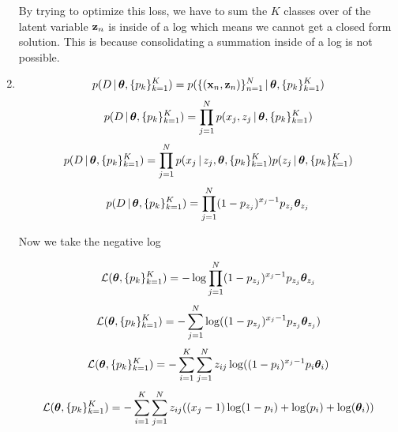 \documentclass[submit]{harvardml}
\begin{document}
\begin{enumerate}
        By trying to optimize this loss, we have to sum the $K$ classes over of the latent variable $\mathbf{z}_{n}$ is inside of a log which means we cannot get a closed form solution. This is because consolidating a summation inside of a log is not possible.
    
    \item
        \begin{equation*}
            p(D \,|\,\boldsymbol{\theta}, \{p_k\}^K_{k=1}) =  p(\{(\mathbf{x}_n, \mathbf{z}_n)\}_{n=1}^N \,|\,\boldsymbol{\theta}, \{p_k\}^K_{k=1})
        \end{equation*}
        \begin{equation*}
            p(D \,|\,\boldsymbol{\theta}, \{p_k\}^K_{k=1})  =  \prod_{j=1}^N p(x_j, z_j \,|\,\boldsymbol{\theta}, \{p_k\}^K_{k=1})
        \end{equation*}
        \begin{equation*}
            p(D \,|\,\boldsymbol{\theta}, \{p_k\}^K_{k=1})  =  \prod_{j=1}^N p(x_j \,|\, z_j,\boldsymbol{\theta}, \{p_k\}^K_{k=1}) p(z_j \,|\,\boldsymbol{\theta}, \{p_k\}^K_{k=1})
        \end{equation*}
        \begin{equation*}
            p(D \,|\,\boldsymbol{\theta}, \{p_k\}^K_{k=1}) = \prod_{j=1}^N (1-p_{z_j})^{x_j - 1}p_{z_j} \boldsymbol{\theta}_{z_j}
        \end{equation*}
        \begin{center}
            Now we take the negative log
        \end{center}
        \begin{equation*}
             \mathcal{L}(\boldsymbol{\theta}, \{p_k\}^K_{k=1}) = - \log \prod_{j=1}^N (1-p_{z_j})^{x_j - 1}p_{z_j} \boldsymbol{\theta}_{z_j}
        \end{equation*}
        \begin{equation*}
             \mathcal{L}(\boldsymbol{\theta}, \{p_k\}^K_{k=1}) = - \sum_{j=1}^N \log ((1-p_{z_j})^{x_j - 1}p_{z_j} \boldsymbol{\theta}_{z_j})
        \end{equation*}
        \begin{equation*}
             \mathcal{L}(\boldsymbol{\theta}, \{p_k\}^K_{k=1}) = - \sum_{i=1}^K\sum_{j=1}^N z_{ij} \log ((1-p_{i})^{x_j - 1}p_{i} \boldsymbol{\theta}_{i})
        \end{equation*}
        \begin{equation*}
             \mathcal{L}(\boldsymbol{\theta}, \{p_k\}^K_{k=1}) = - \sum_{i=1}^K\sum_{j=1}^N z_{ij} ((x_j -1) \log(1 - p_i) + \log(p_i) + \log(\boldsymbol{\theta}_{i}))
        \end{equation*}
    

\end{enumerate}
\end{document}

